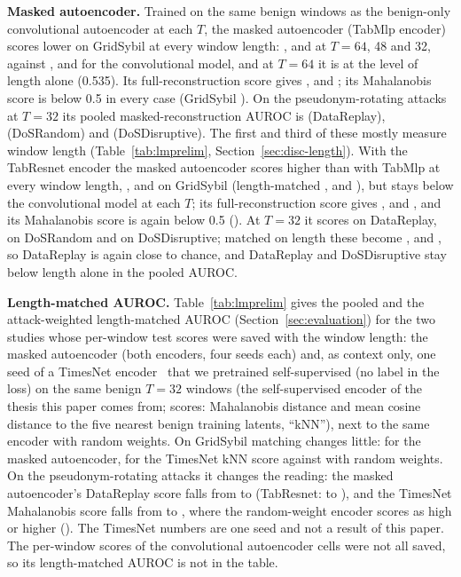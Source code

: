 \textbf{Masked autoencoder.} Trained on the same benign windows as the benign-only convolutional autoencoder at
each $T$, the masked autoencoder (TabMlp encoder) scores lower on GridSybil at every window length:
,  and  at $T=64$, 48 and 32,
against ,  and  for the convolutional model, and at $T=64$ it is at
the level of length alone (0.535). Its full-reconstruction score gives ,  and
; its Mahalanobis score is below 0.5 in every case (GridSybil ). On the
pseudonym-rotating attacks at $T=32$ its pooled masked-reconstruction AUROC is 
(DataReplay),  (DoSRandom) and  (DoSDisruptive). The first
and third of these mostly measure window length (Table~\ref{tab:lmprelim}, Section~\ref{sec:disc-length}).
With the TabResnet encoder the masked autoencoder scores higher than with TabMlp at every window length,
,  and  on GridSybil
(length-matched ,  and ), but stays below the convolutional model at
each $T$; its full-reconstruction score gives ,  and , and its
Mahalanobis score is again below 0.5 (). At $T=32$ it scores 
on DataReplay,  on DoSRandom and  on DoSDisruptive;
matched on length these become ,  and , so DataReplay is again close
to chance, and DataReplay and DoSDisruptive stay below length alone in the pooled AUROC.

\textbf{Length-matched AUROC.} Table~\ref{tab:lmprelim} gives the pooled and the attack-weighted length-matched
AUROC (Section~\ref{sec:evaluation}) for the two studies whose per-window test scores were saved with the window
length: the masked autoencoder (both encoders, four seeds each) and, as context only, one seed of a TimesNet
encoder~\cite{wu2023timesnet} that we pretrained self-supervised (no label in the loss) on the same benign
$T=32$ windows (the
self-supervised encoder of the thesis this paper comes from; scores: Mahalanobis distance and mean cosine distance
to the five nearest benign training latents, ``kNN''), next to the same encoder with random weights. On GridSybil
matching changes little:  for the masked autoencoder,  for
the TimesNet kNN score against  with random weights. On the pseudonym-rotating attacks
it changes the reading: the masked autoencoder's DataReplay score falls from  to
 (TabResnet:  to ), and the TimesNet Mahalanobis score falls from  to ,
where the random-weight encoder scores as high or higher (). The TimesNet numbers are one
seed and not a result of this paper. The per-window scores of the convolutional autoencoder cells were not all
saved, so its length-matched AUROC is not in the table.

